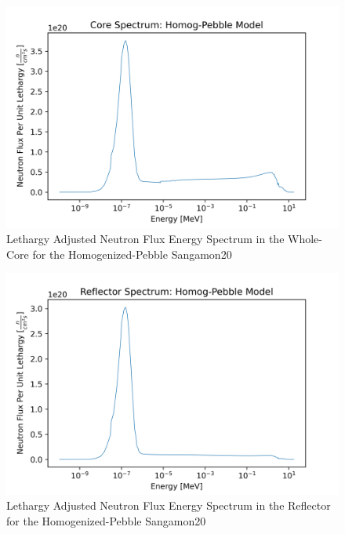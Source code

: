 \begin{figure}[H]
\centering
  \includegraphics[width=0.95\linewidth]{figures/core_spec_homog}
  \caption{Lethargy Adjusted Neutron Flux Energy Spectrum in the Whole-Core for the Homogenized-Pebble Sangamon20}
  \label{fig:hom-core}
\end{figure}

\begin{figure}[H]
\centering
  \includegraphics[width=0.95\linewidth]{figures/reflect_spec_homog}
  \caption{Lethargy Adjusted Neutron Flux Energy Spectrum in the Reflector for the Homogenized-Pebble Sangamon20}
  \label{fig:hom-reflec}
\end{figure}
